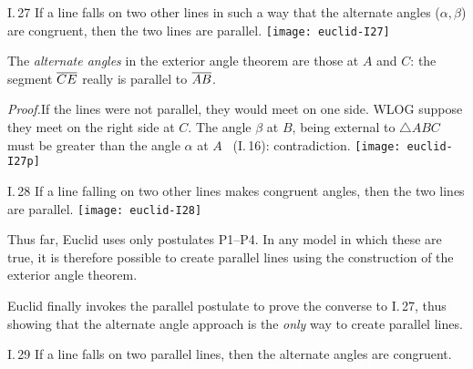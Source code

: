 \begin{thm}[lower separated=false, sidebyside, sidebyside align=top seam, sidebyside gap=0pt, righthand width=0.37\linewidth]{I.\,27}{}
If a line falls on two other lines in such a way that the alternate angles ($\alpha,\beta$) are congruent, then the two lines are parallel.
\tcblower
\flushright\texttt{[image: euclid-I27]}
\end{thm}

The \emph{alternate angles} in the exterior angle theorem are those at $A$ and $C$: the segment $\overline{CE}$ really is parallel to $\overline{AB}$.

\begin{tcolorbox}[proofstyle,lower separated=false, sidebyside, sidebyside align=top seam, sidebyside gap=0pt, righthand width=0.37\linewidth]
	\emph{Proof.}\lstsp If the lines were not parallel, they would meet on one side. WLOG suppose they meet on the right side at $C$.\smallbreak
	The angle $\beta$ at $B$, being external to $\triangle ABC$ must be greater than the angle $\alpha$ at $A$ \ (I.\,16): contradiction.
	\tcblower
	\flushright
	\texttt{[image: euclid-I27p]}\\[-12pt]\hfill\qedsymbol
\end{tcolorbox}


\begin{thm}[lower separated=false, sidebyside, sidebyside align=top seam, sidebyside gap=0pt, righthand width=0.37\linewidth]{I.\,28}{}
	If a line falling on two other lines makes congruent angles, then the two lines are parallel.
	\tcblower
	\flushright\texttt{[image: euclid-I28]}
\end{thm}

\goodbreak

Thus far, Euclid uses only postulates P1--P4. In any model in which these are true, it is therefore possible to create parallel lines using the construction of the exterior angle theorem.\par
Euclid finally invokes the parallel postulate to prove the converse to I.\,27, thus showing that the alternate angle approach is the \emph{only} way to create parallel lines.

\begin{thm}{I.\,29}{}
	If a line falls on two parallel lines, then the alternate angles are congruent.
\end{thm}

